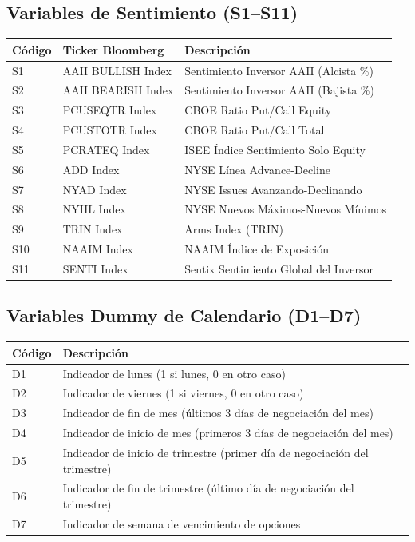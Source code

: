 \documentclass[11pt,a4paper]{article}
\begin{document}
\subsection{Variables de Sentimiento (S1--S11)}

\small
\begin{longtable}{lp{3.5cm}p{7.5cm}}
\toprule
\textbf{Código} & \textbf{Ticker Bloomberg} & \textbf{Descripción} \\
\midrule
\endhead
S1 & AAII BULLISH Index & Sentimiento Inversor AAII (Alcista \%) \\
S2 & AAII BEARISH Index & Sentimiento Inversor AAII (Bajista \%) \\
S3 & PCUSEQTR Index & CBOE Ratio Put/Call Equity \\
S4 & PCUSTOTR Index & CBOE Ratio Put/Call Total \\
S5 & PCRATEQ Index & ISEE Índice Sentimiento Solo Equity \\
S6 & ADD Index & NYSE Línea Advance-Decline \\
S7 & NYAD Index & NYSE Issues Avanzando-Declinando \\
S8 & NYHL Index & NYSE Nuevos Máximos-Nuevos Mínimos \\
S9 & TRIN Index & Arms Index (TRIN) \\
S10 & NAAIM Index & NAAIM Índice de Exposición \\
S11 & SENTI Index & Sentix Sentimiento Global del Inversor \\
\bottomrule
\end{longtable}
\normalsize

\subsection{Variables Dummy de Calendario (D1--D7)}

\small
\begin{longtable}{lp{10cm}}
\toprule
\textbf{Código} & \textbf{Descripción} \\
\midrule
\endhead
D1 & Indicador de lunes (1 si lunes, 0 en otro caso) \\
D2 & Indicador de viernes (1 si viernes, 0 en otro caso) \\
D3 & Indicador de fin de mes (últimos 3 días de negociación del mes) \\
D4 & Indicador de inicio de mes (primeros 3 días de negociación del mes) \\
D5 & Indicador de inicio de trimestre (primer día de negociación del trimestre) \\
D6 & Indicador de fin de trimestre (último día de negociación del trimestre) \\
D7 & Indicador de semana de vencimiento de opciones \\
\bottomrule
\end{longtable}
\normalsize
\end{document}
